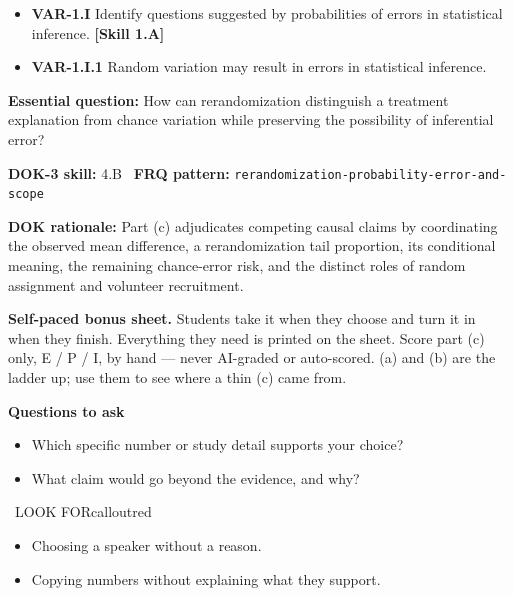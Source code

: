 \documentclass[11pt]{article}
\begin{document}


{\small
\begin{itemize}[leftmargin=1.5em,itemsep=2pt,topsep=2pt]
  \item \textbf{VAR-1.I} Identify questions suggested by probabilities of errors in statistical inference. \textbf{[Skill 1.A]}
  \item \textbf{VAR-1.I.1} Random variation may result in errors in statistical inference.
\end{itemize}
}
\textbf{Essential question:} How can rerandomization distinguish a treatment explanation from chance variation while preserving the possibility of inferential error?\par
\textbf{DOK-3 skill:} 4.B \textperiodcentered\ \textbf{FRQ pattern:} {\small\texttt{rerandomization-\allowbreak{}probability-\allowbreak{}error-\allowbreak{}and-\allowbreak{}scope}}\par
\textbf{DOK rationale:} Part (c) adjudicates competing causal claims by coordinating the observed mean difference, a rerandomization tail proportion, its conditional meaning, the remaining chance-error risk, and the distinct roles of random assignment and volunteer recruitment.\par

\textbf{Self-paced bonus sheet.} Students take it when they choose and turn it in when they finish. Everything they need is printed on the sheet. Score part (c) only, E / P / I, by hand --- never AI-graded or auto-scored. (a) and (b) are the ladder up; use them to see where a thin (c) came from.\par

\textbf{Questions to ask}
\begin{itemize}[leftmargin=1.5em,itemsep=2pt,topsep=2pt]
  \item Which specific number or study detail supports your choice?
  \item What claim would go beyond the evidence, and why?
\end{itemize}

\begin{callout}{\IconWarn\ LOOK FOR}{calloutred}
\begin{itemize}[leftmargin=1.5em,itemsep=2pt,topsep=2pt]
  \item Choosing a speaker without a reason.
  \item Copying numbers without explaining what they support.
\end{itemize}
\end{callout}
\end{document}
